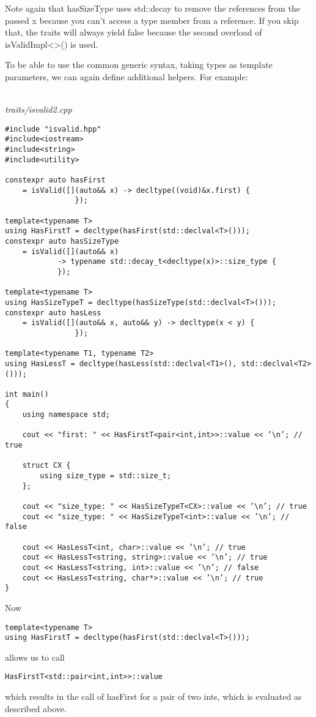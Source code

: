 Note again that hasSizeType uses std::decay to remove the references from the passed x because you can’t access a type member from a reference. If you skip that, the traits will always yield false because the second overload of isValidImpl<>() is used.

To be able to use the common generic syntax, taking types as template parameters, we can again define additional helpers. For example:

\hspace*{\fill} \\ %
\noindent
\textit{traits/isvalid2.cpp}
\begin{lstlisting}[style=styleCXX]
#include "isvalid.hpp"
#include<iostream>
#include<string>
#include<utility>

constexpr auto hasFirst
	= isValid([](auto&& x) -> decltype((void)&x.first) {
				});
			
template<typename T>
using HasFirstT = decltype(hasFirst(std::declval<T>()));
constexpr auto hasSizeType
	= isValid([](auto&& x)
			-> typename std::decay_t<decltype(x)>::size_type {
			});

template<typename T>
using HasSizeTypeT = decltype(hasSizeType(std::declval<T>()));
constexpr auto hasLess
	= isValid([](auto&& x, auto&& y) -> decltype(x < y) {
				});

template<typename T1, typename T2>
using HasLessT = decltype(hasLess(std::declval<T1>(), std::declval<T2>()));

int main()
{
	using namespace std;
	
	cout << "first: " << HasFirstT<pair<int,int>>::value << ’\n’; // true
	
	struct CX {
		using size_type = std::size_t;
	};

	cout << "size_type: " << HasSizeTypeT<CX>::value << ’\n’; // true
	cout << "size_type: " << HasSizeTypeT<int>::value << ’\n’; // false
	
	cout << HasLessT<int, char>::value << ’\n’; // true
	cout << HasLessT<string, string>::value << ’\n’; // true
	cout << HasLessT<string, int>::value << ’\n’; // false
	cout << HasLessT<string, char*>::value << ’\n’; // true
}
\end{lstlisting}

Now

\begin{lstlisting}[style=styleCXX]
template<typename T>
using HasFirstT = decltype(hasFirst(std::declval<T>()));
\end{lstlisting}

allows us to call

\begin{lstlisting}[style=styleCXX]
HasFirstT<std::pair<int,int>>::value
\end{lstlisting}

which results in the call of hasFirst for a pair of two ints, which is evaluated as described above.










